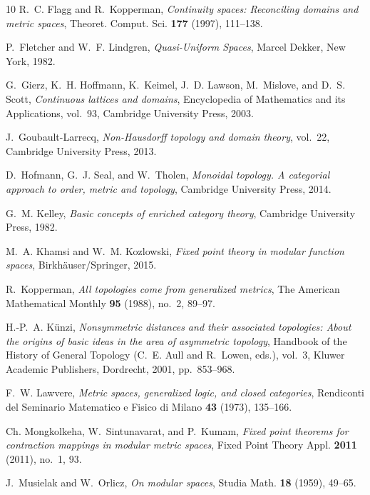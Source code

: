 \documentclass[11pt,a4paper]{amsart}
\theoremstyle{definition}
\begin{document}
\begin{thebibliography}{10}
		R.~C. Flagg and R.~Kopperman, \emph{Continuity spaces: {R}econciling domains
			and metric spaces}, Theoret. Comput. Sci. \textbf{177} (1997), 111--138.
		
		P.~Fletcher and W.~F. Lindgren, \emph{Quasi-{U}niform {S}paces}, Marcel Dekker,
		New York, 1982.
		
		G.~Gierz, K.~H. Hoffmann, K.~Keimel, J.~D. Lawson, M.~Mislove, and D.~S. Scott,
		\emph{Continuous lattices and domains}, Encyclopedia of Mathematics and its
		Applications, vol.~93, Cambridge University Press, 2003.
		
		J.~Goubault-Larrecq, \emph{Non-{H}ausdorff topology and domain theory},
		vol.~22, Cambridge University Press, 2013.
		
		D.~Hofmann, G.~J. Seal, and W.~Tholen, \emph{Monoidal topology. {A} categorial
			approach to order, metric and topology}, Cambridge University Press, 2014.
		
		G.~M. Kelley, \emph{Basic concepts of enriched category theory}, Cambridge
		University Press, 1982.
		
		M.~A. Khamsi and W.~M. Kozlowski, \emph{Fixed point theory in modular function
			spaces}, Birkh\"{a}user/Springer, 2015.
		
		R.~Kopperman, \emph{All topologies come from generalized metrics}, The American
		Mathematical Monthly \textbf{95} (1988), no.~2, 89--97.
		
		H.-P.~A. K{\"u}nzi, \emph{Nonsymmetric distances and their associated
			topologies: {A}bout the origins of basic ideas in the area of asymmetric
			topology}, Handbook of the History of General Topology (C.~E. Aull and
		R.~Lowen, eds.), vol.~3, Kluwer Academic Publishers, Dordrecht, 2001,
		pp.~853--968.
		
		F.~W. Lawvere, \emph{Metric spaces, generalized logic, and closed categories},
		Rendiconti del Seminario Matematico e Fisico di Milano \textbf{43} (1973),
		135--166.
		
		Ch. Mongkolkeha, W.~Sintunavarat, and P.~Kumam, \emph{Fixed point theorems for
			contraction mappings in modular metric spaces}, Fixed Point Theory Appl.
		\textbf{2011} (2011), no.~1, 93.
		
		J.~Musielak and W.~Orlicz, \emph{On modular spaces}, Studia Math. \textbf{18}
		(1959), 49--65.
		

\end{thebibliography}
\end{document}
